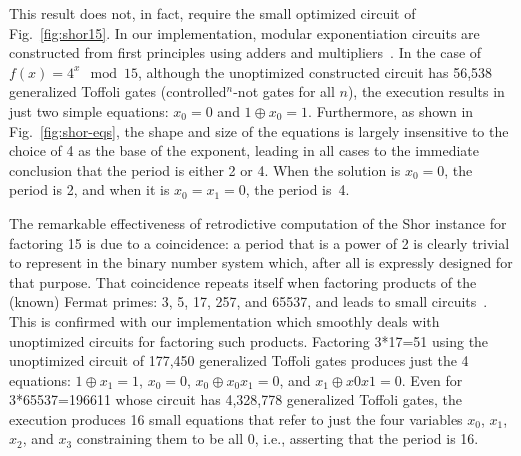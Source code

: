 \documentclass[sigplan]{acmart}
\begin{document}
This result does not, in fact, require the small optimized circuit of
Fig.~\ref{fig:shor15}. In our implementation, modular exponentiation
circuits are constructed from first principles using adders and
multipliers~\cite{PhysRevA.54.147}. In the case of $f(x) = 4^x
\mod{15}$, although the unoptimized constructed circuit has 56,538
generalized Toffoli gates (controlled$^{n}$-not gates for all $n$),
the execution results in just two simple equations: $x_0 = 0$ and $1
\oplus x_0 = 1$. Furthermore, as shown in Fig.~\ref{fig:shor-eqs}, the
shape and size of the equations is largely insensitive to the choice
of 4 as the base of the exponent, leading in all cases to the
immediate conclusion that the period is either 2 or 4. When the
solution is $x_0=0$, the period is 2, and when it is $x_0=x_1=0$, the
period is~4.

The remarkable effectiveness of retrodictive computation of the Shor
instance for factoring 15 is due to a coincidence: a period that is a
power of 2 is clearly trivial to represent in the binary number system
which, after all is expressly designed for that purpose. That
coincidence repeats itself when factoring products of the (known)
Fermat primes: 3, 5, 17, 257, and 65537, and leads to small
circuits~\cite{shorFermat}. This is confirmed with our implementation
which smoothly deals with unoptimized circuits for factoring such
products. Factoring 3*17=51 using the unoptimized circuit of 177,450
generalized Toffoli gates produces just the 4 equations: $1 \oplus x_1
= 1$, $x_0 = 0$, $x_0 \oplus x_0x_1 = 0$, and $x_1 \oplus x0x1 =
0$. Even for 3*65537=196611 whose circuit has 4,328,778 generalized
Toffoli gates, the execution produces 16 small equations that refer to
just the four variables $x_0$, $x_1$, $x_2$, and $x_3$ constraining
them to be all 0, i.e., asserting that the period is 16.
\end{document}

